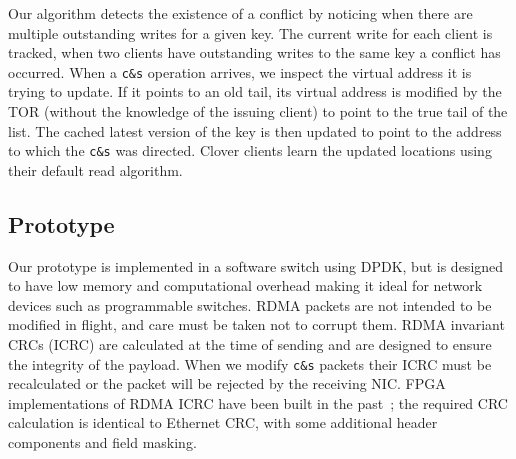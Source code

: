 Our algorithm detects the existence of a conflict by noticing when
there are multiple outstanding writes for a given key. The current
write for each client is tracked, when two clients have outstanding
writes to the same key a conflict has occurred. When a \texttt{c\&s}
operation arrives, we inspect the virtual address it is trying to
update. If it points to an old tail, its virtual address is modified
by the TOR (without the knowledge of the issuing client) to point to
the true tail of the list. The cached latest version of the key is
then updated to point to the address to which the \texttt{c\&s} was
directed. Clover clients learn the updated locations using their
default read algorithm.

\subsection{Prototype}

Our prototype is implemented in a software switch using DPDK, but is
designed to have low memory and computational overhead making it ideal
for network devices such as programmable switches.  RDMA packets are
not intended to be modified in flight, and care must be taken not to
corrupt them. RDMA invariant CRCs (ICRC) are calculated at the time of
sending and are designed to ensure the integrity of the payload. When
we modify \texttt{c\&s} packets their ICRC must be recalculated or the packet
will be rejected by the receiving NIC. FPGA implementations of RDMA
ICRC have been built in the past~\cite{Mansour_2019}; the required CRC
calculation is identical to Ethernet CRC, with some additional header
components and field masking.


